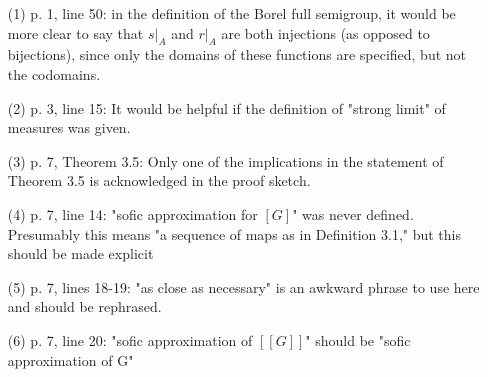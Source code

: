 \documentclass[11pt]{amsart}
\theoremstyle{plain}		\newtheorem{theorem}[generalnumbering]{Theorem}
\theoremstyle{plain}		\newtheorem{corollary}[generalnumbering]{Corollary}
\theoremstyle{definition}		\newtheorem{definition}[generalnumbering]{Definition}
\theoremstyle{definition}		\newtheorem{example}[generalnumbering]{Example}
\theoremstyle{plain}		\newtheorem{proposition}[generalnumbering]{Proposition}
\theoremstyle{plain}		\newtheorem{lemma}[generalnumbering]{Lemma}
\begin{document}
\begin{enumerate}
\item[(1)] p. 1, line 50: in the definition of the Borel full semigroup, it
would be more clear to say that $s|_A$ and $r|_A$ are both injections (as
opposed to bijections), since only the domains of these functions are
specified, but not the codomains.
\item[(2)] p. 3, line 15: It would be helpful if the definition of "strong
limit" of measures was given.
\item[(3)] p. 7, Theorem 3.5: Only one of the implications in the statement
of Theorem 3.5 is acknowledged in the proof sketch.
\item[(4)] p. 7, line 14: "sofic approximation for $[G]$" was never defined.
Presumably this means "a sequence of maps as in Definition 3.1," but
this should be made explicit
\item[(5)] p. 7, lines 18-19: "as close as necessary" is an awkward phrase
to use here and should be rephrased.
\item[(6)] p. 7, line 20: "sofic approximation of $[[G]]$" should be "sofic
approximation of G"
\end{enumerate}



\end{document}
